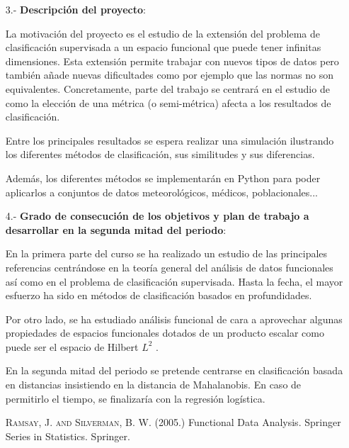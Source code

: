 \documentclass[a4paper,oneside,11pt,leqno]{article}
\begin{document}
\begin{enumerate}
      \item[3.-] {\bf Descripción del proyecto}:

            La motivación del proyecto es el estudio de la extensión del problema de clasificación supervisada a
            un espacio funcional que puede tener infinitas dimensiones. Esta extensión permite trabajar con nuevos tipos de
            datos pero también añade nuevas dificultades como por ejemplo que las normas no son equivalentes. Concretamente,
            parte del trabajo se centrará en el estudio de como la elección de una métrica (o semi-métrica) afecta
            a los resultados de clasificación.

            Entre los principales resultados se espera realizar una simulación ilustrando los diferentes
            métodos de clasificación, sus similitudes y sus diferencias.

            Además, los diferentes métodos se implementarán en Python para poder aplicarlos a conjuntos de datos meteorológicos,
            médicos, poblacionales...

      \item[4.-] {\bf Grado de consecución de los objetivos y plan de trabajo a desarrollar en la segunda mitad del periodo}:

            En la primera parte del curso se ha realizado un estudio de las principales referencias \cite{Ramsay-Silverman, Ferraty-Vieu}
            centrándose en la teoría general del análisis de datos funcionales así como en el problema de clasificación supervisada.
            Hasta la fecha, el mayor esfuerzo ha sido en métodos de clasificación basados en profundidades.

            Por otro lado, se ha estudiado análisis funcional de cara a aprovechar algunas propiedades de espacios funcionales dotados
            de un producto escalar como puede ser el espacio de Hilbert $L^2$ \cite{papa-Rudin}.

            En la segunda mitad del periodo se pretende centrarse en clasificación basada en distancias insistiendo en
            la distancia de Mahalanobis. En caso de permitirlo el tiempo, se finalizaría con la regresión logística.

            \begin{thebibliography}{10}

                  \textsc{Ramsay, J. and Silverman, B. W.} (2005.) Functional Data Analysis.
                  Springer Series in Statistics. Springer.


\end{thebibliography}
\end{enumerate}
\end{document}
